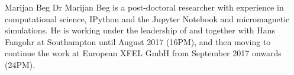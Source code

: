 \begin{participant}[type=R, PM=24,gender=male]{Marijan Beg}
  Dr Marijan Beg is a post-doctoral researcher with experience in
  computational science, IPython and the Jupyter Notebook and micromagnetic
  simulations. He is working under the leadership of and together with Hans
  Fangohr at Southampton until August 2017 (16PM), and then moving to
  continue the work at European XFEL GmbH from September 2017 onwards (24PM).
\end{participant}
